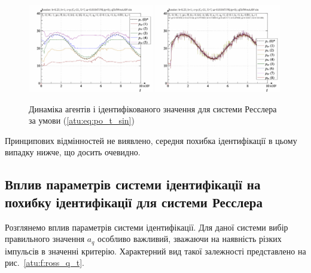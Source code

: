 \begin{figure}[ht!]
\begin{center}
  \includegraphics[width=0.49\textwidth]{p/cha/ross/ross_id-p_t_pi_ql3rlWvnAAW_sin.png}
  \hfill
  \includegraphics[width=0.49\textwidth]{p/cha/ross/ross_id-p_t_p_ql3rlWvnAAW_sin.png}
\end{center}
\caption{Динаміка агентів і ідентифікованого значення для системи Ресслера за умови (\ref{atu:eq:po_t_sin})}
\label{atu:f:ross_id_sin}
\end{figure}

Принципових відмінностей не виявлено, середня похибка
ідентифікації в цьому випадку нижче, що досить очевидно.



\subsection{Вплив параметрів системи ідентифікації на похибку ідентифікації для системи Ресслера} %

Розглянемо вплив параметрів системи ідентифікації. Для даної
системи вибір правильного значення
$a_q$ особливо важливий, зважаючи на наявність різких імпульсів
в значенні критерію. Характерний вид такої залежності
представлено на рис.~\ref{atu:f:ross_q_t}.

